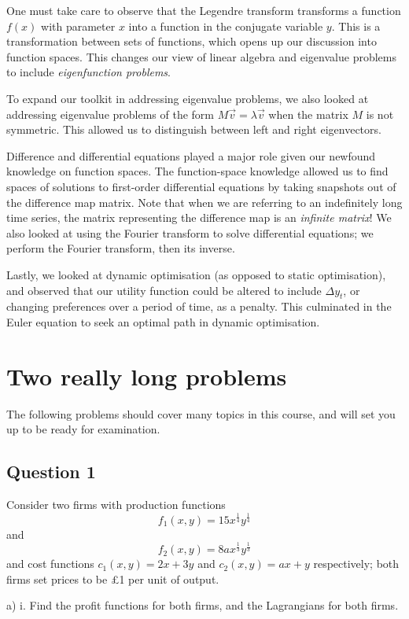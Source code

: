 \documentclass[a4paper, 12pt,oneside,openany]{book}
\begin{document}
One must take care to observe that the Legendre transform transforms a function $f(x)$ with parameter $x$ into a function in the conjugate variable $y$. This is a transformation between sets of functions, which opens up our discussion into function spaces. This changes our view of linear algebra and eigenvalue problems to include \emph{eigenfunction problems}. 

To expand our toolkit in addressing eigenvalue problems, we also looked at addressing eigenvalue problems of the form $M\vec{v} = \lambda\vec{v}$ when the matrix $M$ is not symmetric. This allowed us to distinguish between left and right eigenvectors. 

Difference and differential equations played a major role given our newfound knowledge on function spaces. The function-space knowledge allowed us to find spaces of solutions to first-order differential equations by taking snapshots out of the difference map matrix. Note that when we are referring to an indefinitely long time series, the matrix representing the difference map is an \emph{infinite matrix}! We also looked at using the Fourier transform to solve differential equations; we perform the Fourier transform, then its inverse.

Lastly, we looked at dynamic optimisation (as opposed to static optimisation), and observed that our utility function could be altered to include $\Delta y_t$, or changing preferences over a period of time, as a penalty. This culminated in the Euler equation to seek an optimal path in dynamic optimisation.

\section{Two really long problems}

The following problems should cover many topics in this course, and will set you up to be ready for examination.

\subsection{Question 1} 

Consider two firms with production functions $$f_1(x, y) = 15x^{\frac{1}{4}}y^{\frac{1}{4}}$$ and $$f_2(x, y) = 8ax^{\frac{1}{3}}y^{\frac{1}{3}}$$ and cost functions $c_1(x, y)=2x+3y$ and $c_2(x, y)=ax+y$ respectively; both firms set prices to be £1 per unit of output. 

a) i. Find the profit functions for both firms, and the Lagrangians for both firms.
\end{document}
